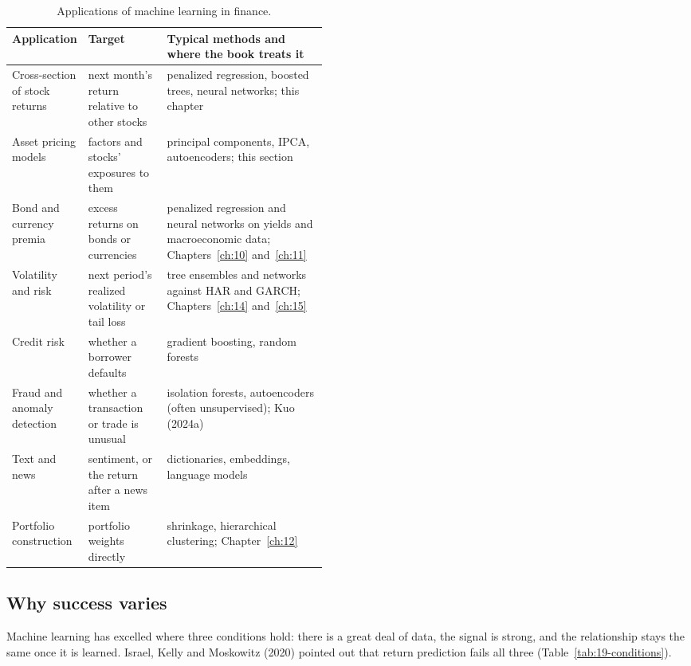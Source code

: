 \begin{table}[htbp]
\centering
\small
\caption{Applications of machine learning in finance.}
\label{tab:19-applications}
\begin{tabularx}{0.95\linewidth}{@{}>{\raggedright\arraybackslash}p{0.21\linewidth}>{\raggedright\arraybackslash}p{0.25\linewidth}>{\raggedright\arraybackslash}X@{}}
\toprule
Application & Target & Typical methods and where the book treats it \\
\midrule
Cross-section of stock returns & next month's return relative to other stocks & penalized regression, boosted trees, neural networks; this chapter \\
Asset pricing models & factors and stocks' exposures to them & principal components, IPCA, autoencoders; this section \\
Bond and currency premia & excess returns on bonds or currencies & penalized regression and neural networks on yields and macroeconomic data; Chapters~\ref{ch:10} and~\ref{ch:11} \\
Volatility and risk & next period's realized volatility or tail loss & tree ensembles and networks against HAR and GARCH; Chapters~\ref{ch:14} and~\ref{ch:15} \\
Credit risk & whether a borrower defaults & gradient boosting, random forests \\
Fraud and anomaly detection & whether a transaction or trade is unusual & isolation forests, autoencoders (often unsupervised); Kuo (2024a) \\
Text and news & sentiment, or the return after a news item & dictionaries, embeddings, language models \\
Portfolio construction & portfolio weights directly & shrinkage, hierarchical clustering; Chapter~\ref{ch:12} \\
\bottomrule
\end{tabularx}
\end{table}

\subsection{Why success varies}

Machine learning has excelled where three conditions hold: there is a great deal of data, the signal is strong, and the relationship stays the same once it is learned. Israel, Kelly and Moskowitz (2020) pointed out that return prediction fails all three (Table~\ref{tab:19-conditions}).

